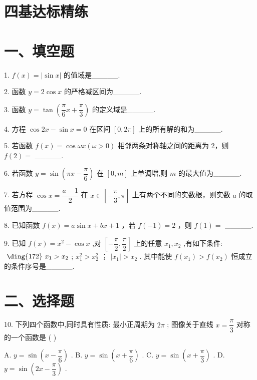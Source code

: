 \section*{四基达标精练}

\section*{一、填空题}

1. $f\left( x\right)  = \left| {\sin x}\right|$ 的值域是\_\_\_\_\_.

2. 函数 $y = 2\cos x$ 的严格减区间为\_\_\_\_\_.

3. 函数 $y = \tan \left( {\dfrac{\pi }{6}x + \dfrac{\pi }{3}}\right)$ 的定义域是\_\_\_\_\_.

4. 方程 $\cos {2x} - \sin x = 0$ 在区间 $\left\lbrack  {0,{2\pi }}\right\rbrack$ 上的所有解的和为\_\_\_\_\_.

5. 若函数 $f\left( x\right)  = \cos {\omega x}\left( {\omega  > 0}\right)$ 相邻两条对称轴之间的距离为 2，则 $f\left( 2\right)  =$ \_\_\_\_\_.

6. 若函数 $y = \sin \left( {{\pi x} - \dfrac{\pi }{6}}\right)$ 在 $\left\lbrack  {0,m}\right\rbrack$ 上单调增,则 $m$ 的最大值为\_\_\_\_\_.

7. 若方程 $\cos x = \dfrac{a - 1}{2}$ 在 $x \in  \left\lbrack  {-\dfrac{\pi }{3},\pi }\right\rbrack$ 上有两个不同的实数根，则实数 $a$ 的取值范围为\_\_\_\_\_.

8. 已知函数 $f\left( x\right)  = a\sin x + {bx} + 1$ ，若 $f\left( {-1}\right)  = 2$ ，则 $f\left( 1\right)  =$ \_\_\_\_\_.

9. 已知 $f\left( x\right)  = {x}^{2} - \cos x$ ,对 $\left\lbrack  {-\dfrac{\pi }{2},\dfrac{\pi }{2}}\right\rbrack$ 上的任意 ${x}_{1},{x}_{2}$ ,有如下条件: $\text{  \ding{172}  }{x}_{1} > {x}_{2}$ ;    ${x}_{1}^{2} > {x}_{2}^{2}$ ；   $\left| {x}_{1}\right|  > {x}_{2}$ . 其中能使 $f\left( {x}_{1}\right)  > f\left( {x}_{2}\right)$ 恒成立的条件序号是\_\_\_\_\_.

\section*{二、选择题}

10. 下列四个函数中,同时具有性质:    最小正周期为 ${2\pi }$ ;    图像关于直线 $x = \dfrac{\pi }{3}$ 对称的一个函数是 ( )

A. $y = \sin \left( {x - \dfrac{\pi }{6}}\right)$ . B. $y = \sin \left( {x + \dfrac{\pi }{6}}\right)$ . C. $y = \sin \left( {x + \dfrac{\pi }{3}}\right)$ . D. $y = \sin \left( {{2x} - \dfrac{\pi }{3}}\right)$ .

